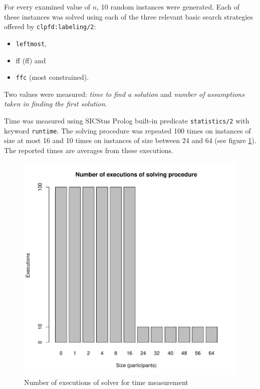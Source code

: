 \documentclass{article}
\newcommand{\code}[1]{\texttt{#1}}
\newcommand{\prolog}{Prolog}
\newcommand{\sicstusprolog}{SICStus \prolog{}}
\begin{document}
For every examined value of $n$, 10 random instances were generated.
Each of these instances was solved using each of the three relevant basic
search strategies offered by \code{clpfd:labeling/2}:

\begin{itemize}
\item \code{leftmost},
\item \acrshort{ff} (\acrlong{ff}) and
\item \code{ffc} (most constrained).
\end{itemize}

Two values were measured: \emph{time to find a solution}
and \emph{number of assumptions taken in finding the first solution}.

Time was measured using \sicstusprolog{} built-in predicate \code{statistics/2}
with keyword \code{runtime}.
The solving procedure was repeated
100 times on instances of size at most 16 and
10 times on instances of size between 24 and 64
(see figure \ref{fig:executions}).
The reported times are averages from these executions.

\begin{figure}
\centering
\includegraphics[width=\linewidth]{executions}
\caption{Number of executions of solver for time measurement}
\label{fig:executions}
\end{figure}
\end{document}
